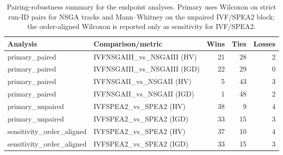 \begin{table}[t]
\centering
\caption{Pairing-robustness summary for the endpoint analyses. Primary uses Wilcoxon on strict run-ID pairs for NSGA tracks and Mann--Whitney on the unpaired IVF/SPEA2 block; the order-aligned Wilcoxon is reported only as sensitivity for IVF/SPEA2.}
\label{tab:hosts_pairing_robustness}
\scriptsize
\begin{tabular}{llrrr}
\toprule
Analysis & Comparison/metric & Wins & Ties & Losses \\
\midrule
primary_paired & IVFNSGAIII_vs_NSGAIII (HV) & 21 & 28 & 2 \\
primary_paired & IVFNSGAIII_vs_NSGAIII (IGD) & 22 & 29 & 0 \\
primary_paired & IVFNSGAII_vs_NSGAII (HV) & 5 & 43 & 3 \\
primary_paired & IVFNSGAII_vs_NSGAII (IGD) & 1 & 48 & 2 \\
primary_unpaired & IVFSPEA2_vs_SPEA2 (HV) & 38 & 9 & 4 \\
primary_unpaired & IVFSPEA2_vs_SPEA2 (IGD) & 33 & 15 & 3 \\
sensitivity_order_aligned & IVFSPEA2_vs_SPEA2 (HV) & 37 & 10 & 4 \\
sensitivity_order_aligned & IVFSPEA2_vs_SPEA2 (IGD) & 33 & 15 & 3 \\
\bottomrule
\end{tabular}
\end{table}
